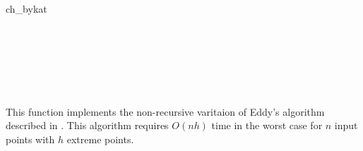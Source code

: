\begin{ccRefFunction}{ch_bykat}
\ccSeeAlso

 \\
 \\
 \\
 \\
 \\

\ccImplementation
This function implements the non-recursive varitaion of
Eddy's algorithm \cite{e-nchap-77} described in \cite{b-chfsp-78}.
This algorithm requires $O(n h)$ time 
in the worst case for $n$ input points with $h$ extreme points.  

\end{ccRefFunction}


